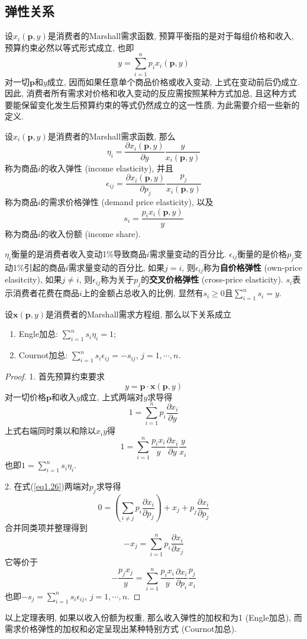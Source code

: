 \documentclass[cn, 12pt, math=mtpro2, bibstyle=apa, blue, twocol]{elegantbook}
\newcommand{\p}{\mathbf{p}}
\newcommand{\x}{\mathbf{x}}
\begin{document}
\subsection{弹性关系}
设$x_i(\p,y)$是消费者的Marshall需求函数, 预算平衡指的是对于每组价格和收入, 预算约束必然以等式形式成立, 也即
$$y=\sum_{i=1}^{n}p_ix_i(\p,y)$$
对一切$\p$和$y$成立, 因而如果任意单个商品价格或收入变动, 上式在变动前后仍成立. 因此, 消费者所有需求对价格和收入变动的反应需按照某种方式加总, 且这种方式要能保留变化发生后预算约束的等式仍然成立的这一性质, 为此需要介绍一些新的定义.

\begin{definition}
设$x_i(\p,y)$是消费者的Marshall需求函数, 那么
$$\eta_i=\frac{\partial x_i(\p,y)}{\partial y}\frac{y}{x_i(\p,y)}$$
称为商品$i$的收入弹性 (income elasticity), 并且
$$\epsilon_{ij}=\frac{\partial x_i(\p,y)}{\partial p_j}\frac{p_j}{x_i(\p,y)}$$
称为商品$i$的需求价格弹性 (demand price elasticity), 以及
$$s_i=\frac{p_ix_i(\p,y)}{y}$$
称为商品$i$的收入份额 (income share).
\end{definition}

$\eta_i$衡量的是消费者收入变动1\%导致商品$i$需求量变动的百分比. $\epsilon_{ij}$衡量的是价格$p_j$变动1\%引起的商品$i$需求量变动的百分比, 如果$j=i$, 则$\epsilon_{ij}$称为\textbf{自价格弹性} (own-price elasitcity), 如果$j\ne i$, 则$\epsilon_{ij}$称为关于$p_j$的\textbf{交叉价格弹性} (cross-price elasticity). $s_i$表示消费者花费在商品$i$上的金额占总收入的比例, 显然有$s_i\ge0$且$\sum_{i=1}^{n}s_i=y$.

\begin{theorem}
  设$\x(\p,y)$是消费者的Marshall需求方程组, 那么以下关系成立
  \begin{enumerate}[label=\arabic*.]
    \item Engle加总: $\sum_{i=1}^{n}s_i\eta_i=1$;
    \item Cournot加总: $\sum_{i=1}^{n}s_i\epsilon_{ij}=-s_{ij}$, $j=1,\cdots,n$.
  \end{enumerate}
\end{theorem}
\begin{proof}
  1. 首先预算约束要求
  \begin{equation}\label{eq1.26}
    y=\p\cdot\x(\p,y)
  \end{equation}
  对一切价格$\p$和收入$y$成立, 上式两端对$y$求导得
  $$1=\sum_{i=1}^{n}p_i\frac{\partial x_i}{\partial y}$$
  上式右端同时乘以和除以$x_iy$得
  $$1=\sum_{i=1}^{n}\frac{p_ix_i}{y}\frac{\partial x_i}{\partial y}\frac{y}{x_i}$$
  也即$1=\sum_{i=1}^{n}s_i\eta_i$.

  2. 在式(\ref{eq1.26})两端对$p_j$求导得
  $$0=\left(\sum_{i\ne j}p_i\frac{\partial x_i}{\partial p_j}\right)+x_j+p_j\frac{\partial x_i}{\partial p_j}$$
  合并同类项并整理得到
  $$-x_j=\sum_{i=1}^{n}p_i\frac{\partial x_i}{\partial x_j}$$
  它等价于
  $$-\frac{p_jx_j}{y}=\sum_{i=1}^{n}\frac{p_ix_i}{y}\frac{\partial x_i}{\partial p_i}\frac{p_j}{x_i}$$
  也即$-s_j=\sum_{i=1}^{n}s_i\epsilon_{ij}$, $j=1,\cdots,n$.
\end{proof}
以上定理表明, 如果以收入份额为权重, 那么收入弹性的加权和为1 (Engle加总), 而需求价格弹性的加权和必定呈现出某种特别方式 (Cournot加总).
\end{document}
